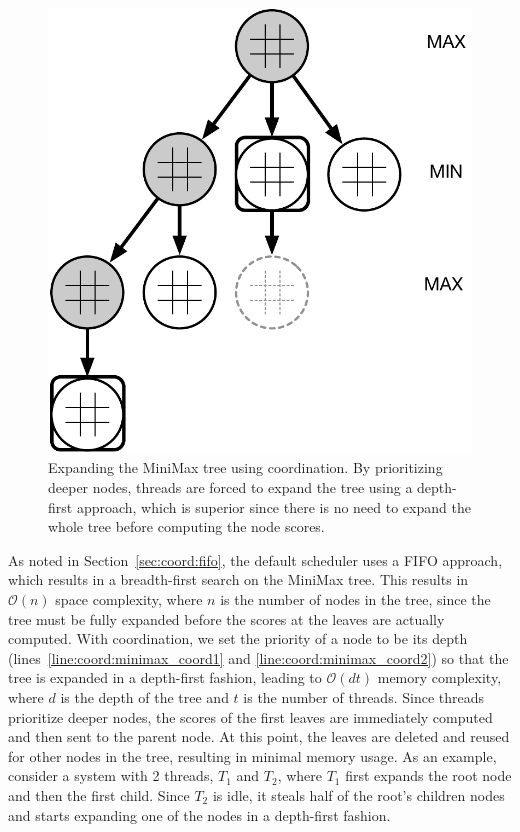 \begin{figure}
   \begin{center}
      \includegraphics[width=0.9\linewidth]{figures/coordination/minimax_tree}
   \end{center}
   \caption{Expanding the MiniMax tree using coordination. By prioritizing
      deeper nodes, threads are forced to expand the tree using a depth-first
      approach, which is superior since there is no need to expand the whole
      tree before computing the node scores.}
   \label{fig:coord:minimax}
\end{figure}

As noted in Section~\ref{sec:coord:fifo}, the default scheduler uses a FIFO
approach, which results in a breadth-first search on the MiniMax tree. This
results in $\mathcal{O}(n)$ space complexity, where $n$ is the number of nodes
in the tree, since the tree must be fully expanded before the scores at the
leaves are actually computed.  With coordination, we set the priority of a node
to be its depth (lines~\ref{line:coord:minimax_coord1} and
\ref{line:coord:minimax_coord2}) so that the tree is expanded in a depth-first
fashion, leading to $\mathcal{O}(d t)$ memory complexity, where $d$ is the depth
of the tree and $t$ is the number of threads. Since threads prioritize deeper
nodes, the scores of the first leaves are immediately computed and then sent to
the parent node. At this point, the leaves are deleted and reused for other
nodes in the tree, resulting in minimal memory usage.  As an example, consider a
system with 2 threads, $T_1$ and $T_2$, where $T_1$ first expands the root node
and then the first child. Since $T_2$ is idle, it steals half of the root's
children nodes and starts expanding one of the nodes in a depth-first fashion.

